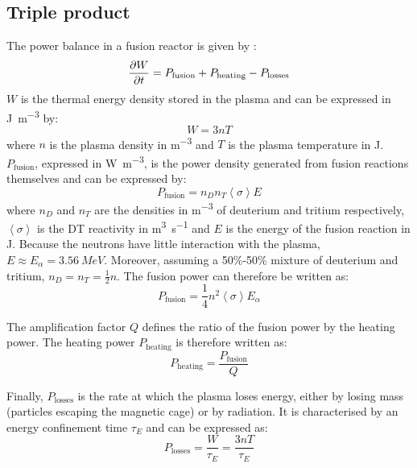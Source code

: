 \subsection{Triple product}
The power balance in a fusion reactor is given by \cite{mccracken_fusion_2013}:
\begin{equation}
    \frac{\partial W}{\partial t} = P_\mathrm{fusion} + P_\mathrm{heating} - P_\mathrm{losses}
    \labeq{plasma energy balance}
\end{equation}
$W$ is the thermal energy density stored in the plasma and can be expressed in \si{J.m^{-3}} by:
\begin{equation}
    W = 3 n T
\end{equation}
where $n$ is the plasma density in \si{m^{-3}} and $T$ is the plasma temperature in \si{J}.
$P_\mathrm{fusion}$, expressed in \si{W.m^{-3}}, is the power density generated from fusion reactions themselves and can be expressed by:
\begin{equation}
    P_\mathrm{fusion} = n_D n_T \left\langle \sigma \right\rangle E
\end{equation}
where $n_D$ and $n_T$ are the densities in \si{m^{-3}} of deuterium and tritium respectively, $\left\langle \sigma \right\rangle$ is the DT reactivity in \si{m^3.s^{-1}} and $E$ is the energy of the fusion reaction in \si{J}.
Because the neutrons have little interaction with the plasma, $E \approx E_\alpha = \SI{3.56}{MeV}$.
Moreover, assuming a 50\%-50\% mixture of deuterium and tritium, $n_D = n_T = \frac{1}{2} n$.
The fusion power can therefore be written as:
\begin{equation}
    P_\mathrm{fusion} = \frac{1}{4} n^2 \left\langle \sigma \right\rangle E_\alpha
\end{equation}

The amplification factor $Q$ defines the ratio of the fusion power by the heating power.
The heating power $P_\mathrm{heating}$ is therefore written as:
\begin{equation}
    P_\mathrm{heating} = \frac{P_\mathrm{fusion}}{Q}
\end{equation}

Finally, $P_\mathrm{losses}$ is the rate at which the plasma loses energy, either by losing mass (particles escaping the magnetic cage) or by radiation.
It is characterised by an energy confinement time $\tau_E$ and can be expressed as:
\begin{equation}
    P_\mathrm{losses} = \frac{W}{\tau_E} = \frac{3 n T}{\tau_E}
\end{equation}

